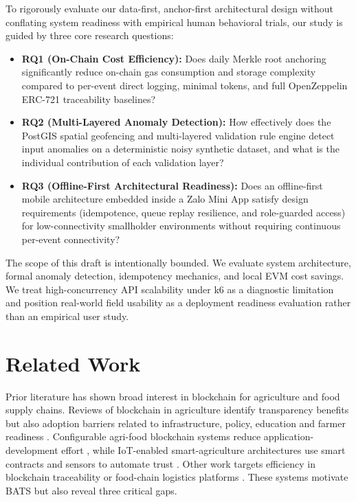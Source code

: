 \documentclass[runningheads]{llncs}
\begin{document}
To rigorously evaluate our data-first, anchor-first architectural design without conflating system readiness with empirical human behavioral trials, our study is guided by three core research questions:
\begin{itemize}
    \item \textbf{RQ1 (On-Chain Cost Efficiency):} Does daily Merkle root anchoring significantly reduce on-chain gas consumption and storage complexity compared to per-event direct logging, minimal tokens, and full OpenZeppelin ERC-721 traceability baselines?
    \item \textbf{RQ2 (Multi-Layered Anomaly Detection):} How effectively does the PostGIS spatial geofencing and multi-layered validation rule engine detect input anomalies on a deterministic noisy synthetic dataset, and what is the individual contribution of each validation layer?
    \item \textbf{RQ3 (Offline-First Architectural Readiness):} Does an offline-first mobile architecture embedded inside a Zalo Mini App satisfy design requirements (idempotence, queue replay resilience, and role-guarded access) for low-connectivity smallholder environments without requiring continuous per-event connectivity?
\end{itemize}

The scope of this draft is intentionally bounded. We evaluate system architecture, formal anomaly detection, idempotency mechanics, and local EVM cost savings. We treat high-concurrency API scalability under k6 as a diagnostic limitation and position real-world field usability as a deployment readiness evaluation rather than an empirical user study.

\section{Related Work}

Prior literature has shown broad interest in blockchain for agriculture and food supply chains. Reviews of blockchain in agriculture identify transparency benefits but also adoption barriers related to infrastructure, policy, education and farmer readiness \cite{ahmad2021blockchain,cuellar2022barriers}. Configurable agri-food blockchain systems reduce application-development effort \cite{marchesi2021automatic}, while IoT-enabled smart-agriculture architectures use smart contracts and sensors to automate trust \cite{pranto2021blockchain,caro2018blockchain}. Other work targets efficiency in blockchain traceability or food-chain logistics platforms \cite{spitalleri2023biotrak,wu2023high}. These systems motivate BATS but also reveal three critical gaps.
\end{document}
